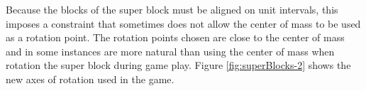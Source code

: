 

Because the blocks of the super block must be aligned on unit intervals, this
imposes a constraint that sometimes does not allow the center of mass to be
used as a rotation point.  The rotation points chosen are close to the center
of mass and in some instances are more natural than using the center of mass
when rotation the super block during game play. Figure \ref{fig:superBlocks-2}
shows the new axes of rotation used in the game.


